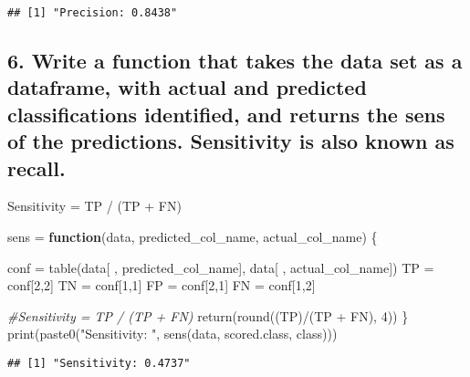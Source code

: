 \documentclass[
]{article}
\newenvironment{Shaded}{\begin{snugshade}}{\end{snugshade}}
\newcommand{\CommentTok}[1]{\textcolor[rgb]{0.56,0.35,0.01}{\textit{#1}}}
\newcommand{\ControlFlowTok}[1]{\textcolor[rgb]{0.13,0.29,0.53}{\textbf{#1}}}
\newcommand{\DecValTok}[1]{\textcolor[rgb]{0.00,0.00,0.81}{#1}}
\newcommand{\FunctionTok}[1]{\textcolor[rgb]{0.00,0.00,0.00}{#1}}
\newcommand{\NormalTok}[1]{#1}
\newcommand{\OtherTok}[1]{\textcolor[rgb]{0.56,0.35,0.01}{#1}}
\newcommand{\SpecialCharTok}[1]{\textcolor[rgb]{0.00,0.00,0.00}{#1}}
\newcommand{\StringTok}[1]{\textcolor[rgb]{0.31,0.60,0.02}{#1}}
\begin{document}
\begin{verbatim}
## [1] "Precision: 0.8438"
\end{verbatim}

\hypertarget{write-a-function-that-takes-the-data-set-as-a-dataframe-with-actual-and-predicted-classifications-identified-and-returns-the-sens-of-the-predictions.-sensitivity-is-also-known-as-recall.}{%
\subsection{6. Write a function that takes the data set as a dataframe,
with actual and predicted classifications identified, and returns the
sens of the predictions. Sensitivity is also known as
recall.}\label{write-a-function-that-takes-the-data-set-as-a-dataframe-with-actual-and-predicted-classifications-identified-and-returns-the-sens-of-the-predictions.-sensitivity-is-also-known-as-recall.}}

Sensitivity = TP / (TP + FN)

\begin{Shaded}
\begin{Highlighting}[]
\NormalTok{sens }\OtherTok{=} \ControlFlowTok{function}\NormalTok{(data, predicted\_col\_name, actual\_col\_name) \{}
  
\NormalTok{  conf }\OtherTok{=} \FunctionTok{table}\NormalTok{(data[ , predicted\_col\_name], data[ , actual\_col\_name])}
\NormalTok{  TP }\OtherTok{=}\NormalTok{ conf[}\DecValTok{2}\NormalTok{,}\DecValTok{2}\NormalTok{]}
\NormalTok{  TN }\OtherTok{=}\NormalTok{ conf[}\DecValTok{1}\NormalTok{,}\DecValTok{1}\NormalTok{]}
\NormalTok{  FP }\OtherTok{=}\NormalTok{ conf[}\DecValTok{2}\NormalTok{,}\DecValTok{1}\NormalTok{]}
\NormalTok{  FN }\OtherTok{=}\NormalTok{ conf[}\DecValTok{1}\NormalTok{,}\DecValTok{2}\NormalTok{]}
  
  \CommentTok{\#Sensitivity = TP / (TP + FN)}
  \FunctionTok{return}\NormalTok{(}\FunctionTok{round}\NormalTok{((TP)}\SpecialCharTok{/}\NormalTok{(TP }\SpecialCharTok{+}\NormalTok{ FN), }\DecValTok{4}\NormalTok{))}
\NormalTok{\}}
\FunctionTok{print}\NormalTok{(}\FunctionTok{paste0}\NormalTok{(}\StringTok{"Sensitivity: "}\NormalTok{, }\FunctionTok{sens}\NormalTok{(data, }\StringTok{\textquotesingle{}scored.class\textquotesingle{}}\NormalTok{, }\StringTok{\textquotesingle{}class\textquotesingle{}}\NormalTok{)))}
\end{Highlighting}
\end{Shaded}

\begin{verbatim}
## [1] "Sensitivity: 0.4737"
\end{verbatim}
\end{document}
